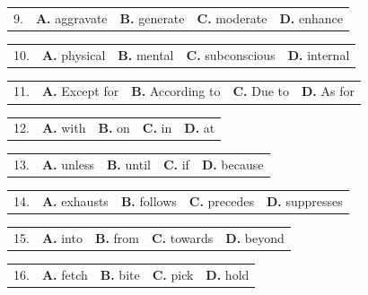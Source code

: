 \documentclass[UTF8,11pt]{ctexart}
\begin{document}
\noindent\begin{tabularx}{\linewidth}{@{}lXXXX@{}}9. & \textbf{A.} aggravate & \textbf{B.} generate & \textbf{C.} moderate & \textbf{D.} enhance\\\end{tabularx}\par

\noindent\begin{tabularx}{\linewidth}{@{}lXXXX@{}}10. & \textbf{A.} physical & \textbf{B.} mental & \textbf{C.} subconscious & \textbf{D.} internal\\\end{tabularx}\par

\noindent\begin{tabularx}{\linewidth}{@{}lXXXX@{}}11. & \textbf{A.} Except for & \textbf{B.} According to & \textbf{C.} Due to & \textbf{D.} As for\\\end{tabularx}\par

\noindent\begin{tabularx}{\linewidth}{@{}lXXXX@{}}12. & \textbf{A.} with & \textbf{B.} on & \textbf{C.} in & \textbf{D.} at\\\end{tabularx}\par

\noindent\begin{tabularx}{\linewidth}{@{}lXXXX@{}}13. & \textbf{A.} unless & \textbf{B.} until & \textbf{C.} if & \textbf{D.} because\\\end{tabularx}\par

\noindent\begin{tabularx}{\linewidth}{@{}lXXXX@{}}14. & \textbf{A.} exhausts & \textbf{B.} follows & \textbf{C.} precedes & \textbf{D.} suppresses\\\end{tabularx}\par

\noindent\begin{tabularx}{\linewidth}{@{}lXXXX@{}}15. & \textbf{A.} into & \textbf{B.} from & \textbf{C.} towards & \textbf{D.} beyond\\\end{tabularx}\par

\noindent\begin{tabularx}{\linewidth}{@{}lXXXX@{}}16. & \textbf{A.} fetch & \textbf{B.} bite & \textbf{C.} pick & \textbf{D.} hold\\\end{tabularx}\par
\end{document}
